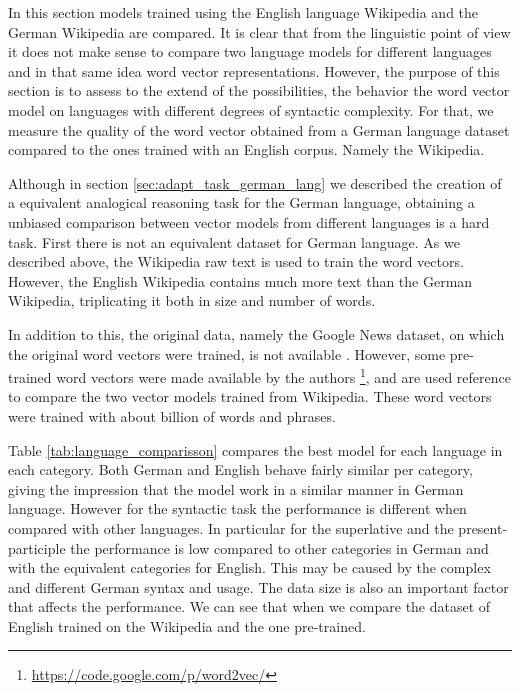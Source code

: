 In this section models trained using the English language Wikipedia and the
German Wikipedia  are compared. It is clear that from the linguistic
point of view it does not make sense to compare two language models for
different languages and in that same idea word vector representations. 
However, the purpose of this section is to assess to the extend of the
possibilities, the behavior the word vector model on languages with different
degrees of syntactic complexity. For that, we measure the quality of the word
vector obtained from a  German language  dataset compared to the ones trained
with an  English corpus. Namely the Wikipedia.

Although in section \ref{sec:adapt_task_german_lang} we described the
creation of a  equivalent analogical reasoning task for the German language,
obtaining  a unbiased comparison between vector models from different
languages is a hard task.  First there is not an equivalent dataset for
German language.  As we described above, the Wikipedia raw text is used to
train the word vectors. However, the English Wikipedia contains much more
text than the German Wikipedia, triplicating it both in size and  number of words.

In addition to this, the original data, namely the Google News dataset, on
which the original word vectors were trained, is not available
\cite{DBLP:journals/corr/abs-1301-3781}. However, some pre-trained word
vectors were made available by the authors \footnote{\url{https://code.google.com/p/word2vec/}}, and
are used reference to compare the two vector models trained from Wikipedia.
These word vectors were trained with about billion of words and phrases.


Table \ref{tab:language_comparisson} compares the best model for each language in each
category. Both German and English behave fairly similar per category, giving
the impression that the model work in a similar manner in German language.
However for the syntactic task  the performance is  different when
compared with other languages. In particular for the superlative and the
present-participle  the performance is low compared to other categories in
German and with the  equivalent categories for English. This may be caused by
the complex and different German syntax and usage. The data size is also an
important factor that affects the performance.  We can see that when we
compare the dataset of English trained on the Wikipedia and the one  pre-trained. 


